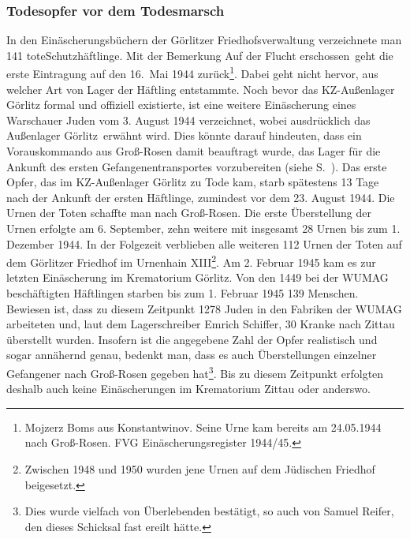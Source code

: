 \subsubsection{Todesopfer vor dem Todesmarsch}

In den Einäscherungsbüchern der Görlitzer Friedhofsverwaltung verzeichnete man 141 tote\linebreak \glqq Schutzhäftlinge\grqq. Mit der Bemerkung \glqq Auf der Flucht erschossen\grqq~geht die erste Eintragung auf den 16.~Mai 1944 zurück\footnote{Mojzerz Boms aus Konstantwinov. Seine Urne kam bereits am 24.05.1944 nach Groß-Rosen. FVG Einäscherungsregister 1944/45.}. Dabei geht nicht hervor, aus welcher Art von Lager der Häftling entstammte. Noch bevor das KZ-Außenlager Görlitz formal und offiziell existierte, ist eine weitere Einäscherung eines Warschauer Juden vom 3. August 1944 verzeichnet, wobei ausdrücklich das \glqq Außenlager Görlitz\grqq~erwähnt wird. Dies könnte darauf hindeuten, dass ein Vorauskommando aus Groß-Rosen damit beauftragt wurde, das Lager für die Ankunft des ersten Gefangenentransportes vorzubereiten (siehe S.~\pageref{vorauskommando}).
\newline
Das erste Opfer, das im KZ-Außenlager Görlitz zu Tode kam, starb spätestens 13 Tage nach der Ankunft der ersten Häftlinge, zumindest vor dem 23. August 1944. Die Urnen der Toten schaffte man nach Groß-Rosen. Die erste Überstellung der Urnen erfolgte am 6. September, zehn weitere mit insgesamt 28 Urnen bis zum 1. Dezember 1944. In der Folgezeit verblieben alle weiteren 112 Urnen der Toten auf dem Görlitzer Friedhof im Urnenhain XIII\footnote{Zwischen 1948 und 1950 wurden jene Urnen auf dem Jüdischen Friedhof beigesetzt.}. Am 2. Februar 1945 kam es zur letzten Einäscherung im Krematorium Görlitz. Von den 1449 bei der WUMAG beschäftigten Häftlingen starben bis zum 1. Februar 1945 139 Menschen. Bewiesen ist, dass zu diesem Zeitpunkt 1278 Juden in den Fabriken der WUMAG arbeiteten und, laut dem Lagerschreiber Emrich Schiffer, 30 Kranke nach Zittau überstellt wurden. Insofern ist die angegebene Zahl der Opfer realistisch und sogar annähernd genau, bedenkt man, dass es auch Überstellungen einzelner Gefangener nach Groß-Rosen gegeben hat\footnote{Dies wurde vielfach von Überlebenden bestätigt, so auch von Samuel Reifer, den dieses Schicksal fast ereilt hätte.}.
Bis zu diesem Zeitpunkt erfolgten deshalb auch keine Einäscherungen im Krematorium Zittau oder anderswo. 
